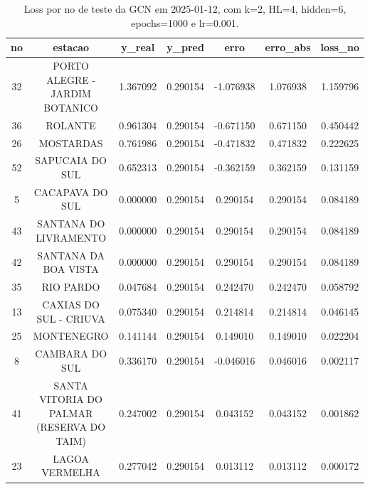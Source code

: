 \begin{table}[h]
\centering
\caption{Loss por no de teste da GCN em 2025-01-12, com k=2, HL=4, hidden=6, epochs=1000 e lr=0.001.}
\label{tab:gcn_loss_k2_hl4_h6_e1000_d20250112}
\begin{tabular}{ccccccc}
\toprule
no & estacao & y\_real & y\_pred & erro & erro\_abs & loss\_no \\
\midrule
32 & PORTO ALEGRE - JARDIM BOTANICO & 1.367092 & 0.290154 & -1.076938 & 1.076938 & 1.159796 \\
36 & ROLANTE & 0.961304 & 0.290154 & -0.671150 & 0.671150 & 0.450442 \\
26 & MOSTARDAS & 0.761986 & 0.290154 & -0.471832 & 0.471832 & 0.222625 \\
52 & SAPUCAIA DO SUL & 0.652313 & 0.290154 & -0.362159 & 0.362159 & 0.131159 \\
5 & CACAPAVA DO SUL & 0.000000 & 0.290154 & 0.290154 & 0.290154 & 0.084189 \\
43 & SANTANA DO LIVRAMENTO & 0.000000 & 0.290154 & 0.290154 & 0.290154 & 0.084189 \\
42 & SANTANA DA BOA VISTA & 0.000000 & 0.290154 & 0.290154 & 0.290154 & 0.084189 \\
35 & RIO PARDO & 0.047684 & 0.290154 & 0.242470 & 0.242470 & 0.058792 \\
13 & CAXIAS DO SUL - CRIUVA & 0.075340 & 0.290154 & 0.214814 & 0.214814 & 0.046145 \\
25 & MONTENEGRO & 0.141144 & 0.290154 & 0.149010 & 0.149010 & 0.022204 \\
8 & CAMBARA DO SUL & 0.336170 & 0.290154 & -0.046016 & 0.046016 & 0.002117 \\
41 & SANTA VITORIA DO PALMAR (RESERVA DO TAIM) & 0.247002 & 0.290154 & 0.043152 & 0.043152 & 0.001862 \\
23 & LAGOA VERMELHA & 0.277042 & 0.290154 & 0.013112 & 0.013112 & 0.000172 \\
\bottomrule
\end{tabular}
\end{table}
